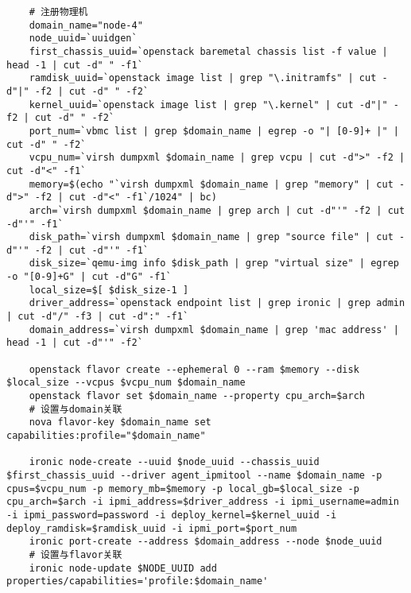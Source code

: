\documentclass[a4paper,left=1.5cm,right=1.5cm,11pt]{article}
\begin{document}
	\begin{lstlisting}
	# 注册物理机
	domain_name="node-4"
	node_uuid=`uuidgen`
	first_chassis_uuid=`openstack baremetal chassis list -f value | head -1 | cut -d" " -f1`
	ramdisk_uuid=`openstack image list | grep "\.initramfs" | cut -d"|" -f2 | cut -d" " -f2`
	kernel_uuid=`openstack image list | grep "\.kernel" | cut -d"|" -f2 | cut -d" " -f2`
	port_num=`vbmc list | grep $domain_name | egrep -o "| [0-9]+ |" | cut -d" " -f2`
	vcpu_num=`virsh dumpxml $domain_name | grep vcpu | cut -d">" -f2 | cut -d"<" -f1`
	memory=$(echo "`virsh dumpxml $domain_name | grep "memory" | cut -d">" -f2 | cut -d"<" -f1`/1024" | bc)
	arch=`virsh dumpxml $domain_name | grep arch | cut -d"'" -f2 | cut -d"'" -f1`
	disk_path=`virsh dumpxml $domain_name | grep "source file" | cut -d"'" -f2 | cut -d"'" -f1`
	disk_size=`qemu-img info $disk_path | grep "virtual size" | egrep -o "[0-9]+G" | cut -d"G" -f1`
	local_size=$[ $disk_size-1 ]
	driver_address=`openstack endpoint list | grep ironic | grep admin | cut -d"/" -f3 | cut -d":" -f1`
	domain_address=`virsh dumpxml $domain_name | grep 'mac address' | head -1 | cut -d"'" -f2`

	openstack flavor create --ephemeral 0 --ram $memory --disk $local_size --vcpus $vcpu_num $domain_name
	openstack flavor set $domain_name --property cpu_arch=$arch
	# 设置与domain关联
	nova flavor-key $domain_name set capabilities:profile="$domain_name"

	ironic node-create --uuid $node_uuid --chassis_uuid $first_chassis_uuid --driver agent_ipmitool --name $domain_name -p cpus=$vcpu_num -p memory_mb=$memory -p local_gb=$local_size -p cpu_arch=$arch -i ipmi_address=$driver_address -i ipmi_username=admin -i ipmi_password=password -i deploy_kernel=$kernel_uuid -i deploy_ramdisk=$ramdisk_uuid -i ipmi_port=$port_num
	ironic port-create --address $domain_address --node $node_uuid
	# 设置与flavor关联
	ironic node-update $NODE_UUID add properties/capabilities='profile:$domain_name'
	\end{lstlisting}
\end{document}
